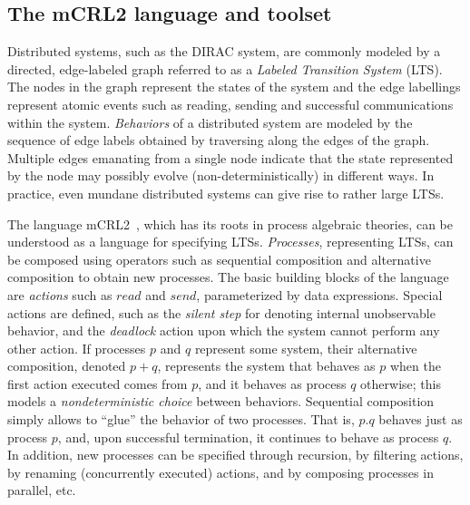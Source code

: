 \documentclass[10pt,conference]{IEEEtran}
\begin{document}
\subsection{The mCRL2 language and toolset}
Distributed systems, such as the DIRAC system, are commonly modeled by a
directed, edge-labeled graph referred to as a \emph{Labeled Transition
System} (LTS). The nodes in the graph represent the states of the system
and the edge labellings represent atomic events such as reading, sending
and successful communications within the system. \emph{Behaviors} of a
distributed system are modeled by the sequence of edge labels obtained
by traversing along the edges of the graph.  Multiple edges emanating
from a single node indicate that the state represented by the node may
possibly evolve (non-deterministically) in different ways. In practice,
even mundane distributed systems can give rise to rather large LTSs.

The language mCRL2~\cite{FormalLanguagemCRL2}, which has its roots in process
algebraic theories, can be understood as a language for specifying
LTSs. \emph{Processes}, representing LTSs, can be composed using operators
such as sequential composition and alternative composition to obtain
new processes. The basic building blocks of the language are \emph{actions} such as
\begin{math}read\end{math} and \begin{math}send\end{math}, parameterized by data expressions. Special actions are defined, such 
as the \emph{silent step} for denoting internal unobservable behavior, and the 
\emph{deadlock} action upon which the system cannot perform any other action. 
If processes \begin{math}p\end{math} and \begin{math}q\end{math} represent
some system, their alternative composition, denoted \begin{math}p+q\end{math},
represents the system that behaves as \begin{math}p\end{math} when the first
action executed comes from \begin{math}p\end{math}, and it behaves as process
\begin{math}q\end{math} otherwise; this models a \emph{nondeterministic choice} between behaviors. Sequential composition simply allows to ``glue''
the behavior of two processes. That is, \begin{math}p.q\end{math} behaves
just as process \begin{math}p\end{math}, and, upon successful termination, it
continues to behave as process \begin{math}q\end{math}. In addition, new processes
can be specified through recursion, by filtering actions, by renaming
(concurrently executed) actions, and by composing processes in parallel, etc. 
\end{document}
